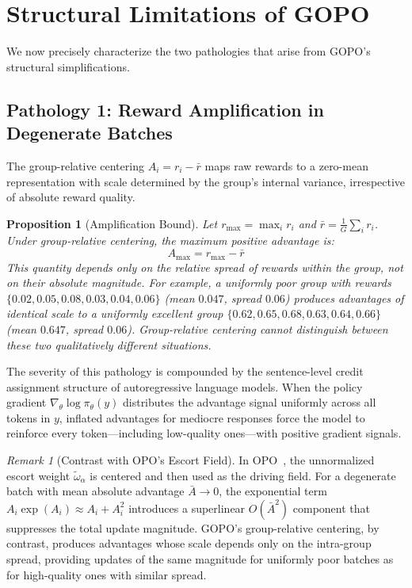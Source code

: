 \documentclass[11pt]{article}
\newtheorem{proposition}[theorem]{Proposition}
\theoremstyle{definition}
\theoremstyle{remark}
\newtheorem{remark}[theorem]{Remark}
\begin{document}
\section{Structural Limitations of GOPO}
\label{sec:problems}

We now precisely characterize the two pathologies that arise from GOPO's structural simplifications.

\subsection{Pathology 1: Reward Amplification in Degenerate Batches}
\label{subsec:amplification}

The group-relative centering $A_i = r_i - \bar{r}$ maps raw rewards to a zero-mean representation with scale determined by the group's internal variance, irrespective of absolute reward quality.

\begin{proposition}[Amplification Bound]
\label{prop:amplification}
Let $r_{\max} = \max_i r_i$ and $\bar{r} = \frac{1}{G}\sum_i r_i$. Under group-relative centering, the maximum positive advantage is:
\begin{equation}
    A_{\max} = r_{\max} - \bar{r}
\end{equation}
This quantity depends only on the \emph{relative spread} of rewards within the group, not on their absolute magnitude. For example, a uniformly poor group with rewards $\{0.02, 0.05, 0.08, 0.03, 0.04, 0.06\}$ (mean $0.047$, spread $0.06$) produces advantages of \emph{identical} scale to a uniformly excellent group $\{0.62, 0.65, 0.68, 0.63, 0.64, 0.66\}$ (mean $0.647$, spread $0.06$). Group-relative centering cannot distinguish between these two qualitatively different situations.
\end{proposition}

The severity of this pathology is compounded by the sentence-level credit assignment structure of autoregressive language models. When the policy gradient $\nabla_\theta \log\pi_\theta(y)$ distributes the advantage signal uniformly across all tokens in $y$, inflated advantages for mediocre responses force the model to reinforce every token---including low-quality ones---with positive gradient signals.

\begin{remark}[Contrast with OPO's Escort Field]
\label{rem:escort_contrast}
In OPO~\cite{Wang2025OPO}, the unnormalized escort weight $\tilde{\omega}_\alpha$ is centered and then used as the driving field. For a degenerate batch with mean absolute advantage $\bar{A} \to 0$, the exponential term $A_i \exp(A_i) \approx A_i + A_i^2$ introduces a superlinear $O(\bar{A}^2)$ component that suppresses the total update magnitude. GOPO's group-relative centering, by contrast, produces advantages whose scale depends only on the intra-group spread, providing updates of the same magnitude for uniformly poor batches as for high-quality ones with similar spread.
\end{remark}
\end{document}
